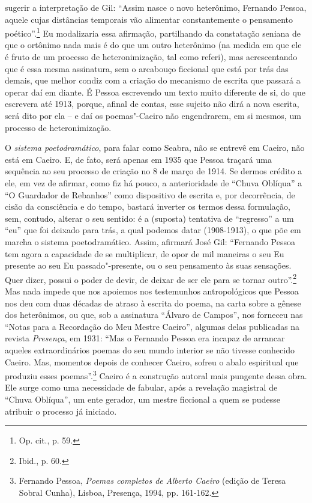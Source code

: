sugerir a interpretação de Gil: ``Assim nasce o novo heterônimo,
Fernando Pessoa, aquele cujas distâncias temporais vão alimentar
constantemente o pensamento poético''.\footnote{Op. cit., p. 59.} Eu
modalizaria essa afirmação, partilhando da constatação seniana de que o
ortônimo nada mais é do que um outro heterônimo (na medida em que ele é
fruto de um processo de heteronimização, tal como referi), mas
acrescentando que é essa mesma assinatura, sem o arcabouço ficcional que
está por trás das demais, que melhor condiz com a criação do mecanismo
de escrita que passará a operar daí em diante. É Pessoa escrevendo um
texto muito diferente de si, do que escrevera até 1913, porque, afinal
de contas, esse sujeito não dirá a nova escrita, será dito por ela -- e
daí os poemas"-Caeiro não engendrarem, em si mesmos, um processo de
heteronimização.

O \emph{sistema poetodramático}, para falar como Seabra, não se entrevê
em Caeiro, não está em Caeiro. E, de fato, será apenas em 1935 que
Pessoa traçará uma sequência ao seu processo de criação no 8 de março de
1914. Se dermos crédito a ele, em vez de afirmar, como fiz há pouco, a
anterioridade de ``Chuva Oblíqua'' a ``O Guardador de Rebanhos'' como
dispositivo de escrita e, por decorrência, de cisão da consciência e do
tempo, bastará inverter os termos dessa formulação, sem, contudo,
alterar o seu sentido: é a (suposta) tentativa de ``regresso'' a um
``eu'' que foi deixado para trás, a qual podemos datar (1908-1913), o
que põe em marcha o sistema poetodramático. Assim, afirmará José Gil:
``Fernando Pessoa tem agora a capacidade de se multiplicar, de opor de
mil maneiras o seu Eu presente ao seu Eu passado"-presente, ou o seu
pensamento às suas sensações. Quer dizer, possui o poder de devir, de
deixar de ser ele para se tornar outro''.\footnote{Ibid., p. 60.} Mas
nada impede que nos apoiemos nos testemunhos antropológicos que
Pessoa nos deu com duas décadas de atraso à escrita do poema, na carta
sobre a gênese dos heterônimos, ou que, sob a assinatura ``Álvaro de
Campos'', nos forneceu nas ``Notas para a Recordação do Meu Mestre
Caeiro'', algumas delas publicadas na revista \emph{Presença}, em 1931: ``Mas o
Fernando Pessoa era incapaz de arrancar aqueles extraordinários poemas
do seu mundo interior se não tivesse conhecido Caeiro. Mas, momentos
depois de conhecer Caeiro, sofreu o abalo espiritual que produziu esses
poemas''.\footnote{Fernando Pessoa, \emph{Poemas completos de Alberto
  Caeiro} (edição de Teresa Sobral Cunha), Lisboa, Presença, 1994, pp.
  161-162.} Caeiro é a construção autoral mais pungente dessa obra. Ele
surge como uma necessidade de fabular, após a revelação magistral de
``Chuva Oblíqua'', um ente gerador, um mestre ficcional a quem se pudesse atribuir
o processo já iniciado.

